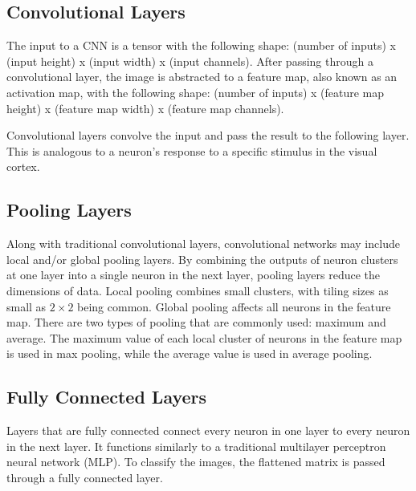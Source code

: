 \documentclass[conference]{IEEEtran}
\begin{document}
\subsection{Convolutional Layers}
The input to a CNN is a tensor with the following shape: (number of inputs) x (input height) x (input width) x (input channels). After passing through a convolutional layer, the image is abstracted to a feature map, also known as an activation map, with the following shape: (number of inputs) x (feature map height) x (feature map width) x (feature map channels).
\par Convolutional layers convolve the input and pass the result to the following layer. This is analogous to a neuron's response to a specific stimulus in the visual cortex.

\subsection{Pooling Layers}
Along with traditional convolutional layers, convolutional networks may include local and/or global pooling layers. By combining the outputs of neuron clusters at one layer into a single neuron in the next layer, pooling layers reduce the dimensions of data. Local pooling combines small clusters, with tiling sizes as small as $2 \times 2$ being common. Global pooling affects all neurons in the feature map\cite{inproceedings, article2}. There are two types of pooling that are commonly used: maximum and average. The maximum value of each local cluster of neurons in the feature map is used in max pooling\cite{yamaguchi1990neural, 6248110}, while the average value is used in average pooling.

\subsection{Fully Connected Layers}
Layers that are fully connected connect every neuron in one layer to every neuron in the next layer. It functions similarly to a traditional multilayer perceptron neural network (MLP). To classify the images, the flattened matrix is passed through a fully connected layer.
\end{document}
